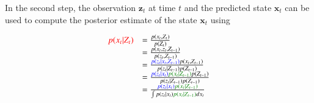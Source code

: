 
In the second step, the observation $\mathbf{z}_t$ at time $t$ and the predicted state $\mathbf{x}_t$ can be used to compute the posterior estimate of the state $\mathbf{x}_t$ using %


{%
\begin{equation}
\begin{array}{lllllllll}
{\color{red}p(x_t | Z_t)} &= \frac{p(x_t, Z_t)}{p(Z_t)}\\
&= \frac{p(x_t, z_t, Z_{t-1})}{p(z_t, Z_{t-1})}\\
&= \frac{{\color{blue}p(z_t|x_t,Z_{t-1})}p(x_t, Z_{t-1})}{p(z_t|Z_{t-1})p(Z_{t-1})}\\
&= \frac{{\color{blue}p(z_t|x_t)}{\color{darkgreen}p(x_t|Z_{t-1})}p(Z_{t-1})}{p(z_t|Z_{t-1})p(Z_{t-1})}\\
&= \frac{{\color{blue}p(z_t|x_t)}{\color{darkgreen}p(x_t|Z_{t-1})}}{\int{p(z_t|x_t){\color{darkgreen}p(x_t |Z_{t-1})}}dx_t}
\end{array}
\label{Eqn:TRK_update}
\end{equation}
}




